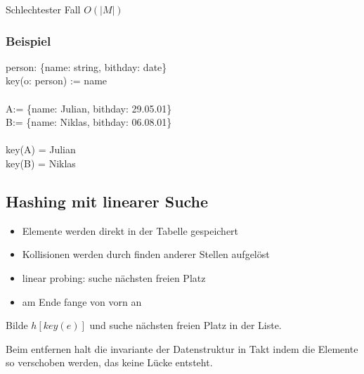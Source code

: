Schlechtester Fall $O(|M|)$

\subsubsection{Beispiel}
person: \{name: string, bithday: date\} \\
key(o: person) := name \\
\\
A:= \{name: Julian, bithday: 29.05.01\} \\
B:= \{name: Niklas, bithday: 06.08.01\} \\
\\
key(A) = Julian \\
key(B) = Niklas \\


\subsection{Hashing mit linearer Suche}
\begin{itemize}
    \item Elemente werden direkt in der Tabelle gespeichert
    \item Kollisionen werden durch finden anderer Stellen aufgelöst
    \item linear probing: suche nächsten freien Platz
    \item am Ende fange von vorn an
\end{itemize}

Bilde $h[key(e)]$ und suche nächsten freien Platz in der Liste.\\

Beim entfernen halt die invariante der Datenstruktur in Takt indem die Elemente so verschoben werden, das keine Lücke entsteht.

